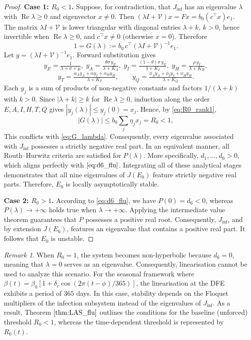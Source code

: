 \documentclass[12pt,a4paper]{article}
\theoremstyle{definition}
\theoremstyle{remark}
\newtheorem{remark}[theorem]{Remark}
\begin{document}
\begin{proof}
\textbf{Case 1: $R_0<1$.}
Suppose, for contradiction, that $J_{\inf}$ has an eigenvalue $\lambda$ with
$\operatorname{Re}\lambda\ge0$ and eigenvector $x\ne0$. Then
$(\lambda I+\mathcal V)x=Fx=b_0(c^{\top}x)e_1$. The matrix $\lambda I+\mathcal V$
is lower triangular with diagonal entries $\lambda+k$, $k>0$, hence invertible
when $\operatorname{Re}\lambda\ge0$, and $c^{\top}x\neq0$ (otherwise $x=0$).
Therefore
\begin{equation}\label{eq:G_lambda}
1=G(\lambda):=b_0\,c^{\top}(\lambda I+\mathcal V)^{-1}e_1 .
\end{equation}
Let $y=(\lambda I+\mathcal V)^{-1}e_1$. Forward substitution gives
\[
y_E=\tfrac{1}{\lambda+\sigma+\mu},\;
y_A=\tfrac{\theta\sigma\,y_E}{\lambda+K_A},\;
y_I=\tfrac{(1-\theta)\sigma\,y_E}{\lambda+K_I},\;
y_H=\tfrac{\rho\,y_I}{\lambda+K_H},
\]
\[
y_T=\tfrac{\alpha_Ay_A+\alpha y_I+\alpha_Hy_H}{\lambda+K_T},\qquad
y_Q=\tfrac{\phi_Ay_A+\phi_Iy_I+\phi_Hy_H}{\lambda+K_Q}.
\]
Each $y_j$ is a sum of products of non-negative constants and factors
$1/(\lambda+k)$ with $k>0$. Since $|\lambda+k|\ge k$ for $\operatorname{Re}\lambda\ge0$,
induction along the order $E,A,I,H,T,Q$ gives $|y_j(\lambda)|\le y_j(0)=x_j$.
Hence, by \eqref{eq:R0_rank1},
\[
|G(\lambda)|\le b_0\sum_{j}\eta_j x_j=R_0<1,
\]
This conflicts with \eqref{eq:G_lambda}. Consequently, every eigenvalue associated with $J_{\inf}$ possesses a strictly negative real part. In an equivalent manner, all Routh–Hurwitz criteria are satisfied for $P(\lambda)$. More specifically, $d_1,\dots,d_6>0$, which aligns perfectly with $\eqref{eq:d6_flu}$. Integrating all of these analytical stages demonstrates that all nine eigenvalues of $J(E_0)$ feature strictly negative real parts. Therefore, $E_0$ is locally asymptotically stable.



\textbf{Case 2: $R_0>1$.}
According to \eqref{eq:d6_flu}, we have $P(0)=d_6<0$, whereas $P(\lambda)\to+\infty$ holds true when $\lambda\to+\infty$. Applying the intermediate value theorem guarantees that $P$ possesses a positive real root. Consequently, $J_{\inf}$, and by extension $J(E_0)$, features an eigenvalue that contains a positive real part. It follows that $E_0$ is unstable.
\end{proof}

\begin{remark}
When $R_0=1$, the system becomes non-hyperbolic because $d_6=0$, meaning that $\lambda=0$ serves as an eigenvalue. Consequently, linearisation cannot be used to analyze this scenario. For the seasonal framework where $\beta(t)=\beta_0[1+\delta_c\cos(2\pi(t-\phi)/365)]$, the linearisation at the DFE exhibits a period of $365$ days. In this case, stability depends on the Floquet multipliers of the infection subsystem instead of the eigenvalues of $J_{\inf}$. As a result, Theorem$~\ref{thm:LAS_flu}$ outlines the conditions for the baseline (unforced) threshold $R_0<1$, whereas the time-dependent threshold is represented by $R_0(t)$.
\end{remark}
\end{document}
